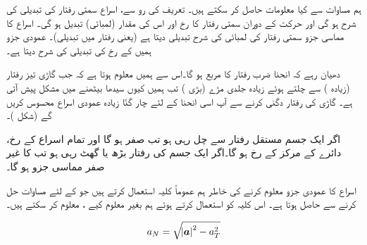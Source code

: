 ہم مساوات  سے کیا معلومات حاصل کر سکتے ہیں۔ تعریف کی رو سے،  اسراع  سمتی رفتار  کی  تبدیلی کی شرح ہو گی اور حرکت کے دوران سمتی رفتار کا رخ اور اس کی مقدار (لمبائی)  تبدیل ہو گی۔ اسراع کا مماسی جزو   سمتی رفتار   کی لمبائی کی شرح تبدیلی دیتا ہے (یعنی رفتار میں تبدیلی)۔ عمودی جزو  ہمیں  کے رخ کی تبدیلی کی شرح دیتا ہے۔

دھیان رہے کہ   انحنا ضرب رفتار کا مربع ہو گا۔اس سے ہمیں معلوم ہوتا ہے کہ جب  گاڑی تیز رفتار (زیادہ ) سے چلتے ہوئے زیادہ جلدی  مڑے (بڑی )   تب ہمیں  کیوں  سیدھا  بیٹھنے میں مشکل پیش آتی ہے۔ گاڑی کی رفتار دگنی کرنے سے آپ اسی انحنا کے لئے  چار گنّا  زیادہ عمودی اسراع محسوس کریں گے (شکل )۔

اگر ایک جسم مستقل رفتار سے چل رہی ہو تب     صفر ہو گا اور تمام اسراع  کے رخ، دائرے کے مرکز کے رخ ہو گا۔اگر ایک جسم کی رفتار بڑھ یا گھٹ رہی ہو تب  کا غیر صفر مماسی جزو ہو گا۔

اسراع کا عمودی جزو  معلوم کرنے کی خاطر ہم عموماً کلیہ  استعمال کرتے ہیں جو  کے لئے 
 مساوات  حل کرنے سے حاصل ہوتا ہے۔ اس کلیہ کو استعمال کرتے ہوئے  ہم بغیر  معلوم کیے ،  معلوم کر سکتے ہیں۔

\begin{align}\label{مساوات_سمتی_تفاعل_اسراع_پ}
a_N=\sqrt{\abs{{{\boldsymbol{a}}}}^2-a_T^2}
\end{align}

